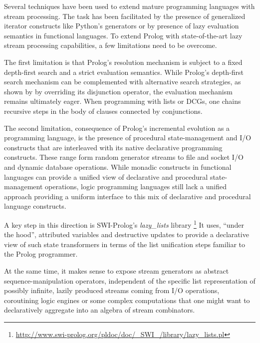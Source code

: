\documentclass{new_tlp}
\begin{document}
Several techniques have been used to extend mature programming languages with stream processing. The task has been facilitated by the presence of generalized iterator constructs like Python's generators or by presence of lazy evaluation semantics in functional languages. To extend Prolog with state-of-the-art lazy stream processing capabilities, a few limitations need to be overcome.

The first limitation is that Prolog's resolution mechanism is subject to a fixed depth-first search and a strict evaluation semantics.
While Prolog's depth-first  search mechanism can be complemented with alternative search strategies, as shown by  by overriding its disjunction operator, the evaluation mechanism remains ultimately eager. When programming with lists or DCGs, one chains recursive steps
in the body of clauses connected by conjunctions. 

The second limitation, consequence of Prolog's incremental evolution as a programming language, is the presence of procedural state-management and I/O constructs that are
interleaved with its native declarative programming constructs. These range form 
random generator streams to file and socket I/O and dynamic database operations.
While monadic constructs in functional languages \cite{moggi:monads,wadler93:cont}  can provide  a unified view of declarative and procedural state-management operations, logic programming languages still lack a unified approach providing a uniform interface to 
this mix of declarative and procedural language constructs.

A key step in this direction is SWI-Prolog's \cite{swi} 
{\em lazy\_lists} library
\footnote{\url{http://www.swi-prolog.org/pldoc/doc/_SWI_/library/lazy_lists.pl}}
 It uses, ``under the hood'', attributed variables and destructive updates  to provide a declarative view of such state transformers in terms of the list unification steps familiar to the Prolog programmer. 
 
At the same time, it makes sense to expose stream generators as abstract sequence-manipulation operators, independent of the specific list representation of
possibly infinite, lazily produced streams coming from I/O operations, coroutining logic engines or some complex computations that one might want to declaratively aggregate into an algebra of stream combinators.
\end{document}
